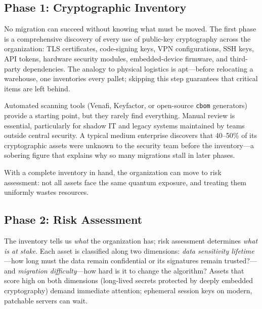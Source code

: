 \subsection{Phase 1: Cryptographic Inventory}
\label{subsec:phase-inventory}

No migration can succeed without knowing what must be moved.  The first phase is a comprehensive discovery of every use of public-key cryptography across the organization: TLS certificates, code-signing keys, VPN configurations, SSH keys, API tokens, hardware security modules, embedded-device firmware, and third-party dependencies.  The analogy to physical logistics is apt---before relocating a warehouse, one inventories every pallet; skipping this step guarantees that critical items are left behind.

Automated scanning tools (Venafi, Keyfactor, or open-source \texttt{cbom} generators) provide a starting point, but they rarely find everything.  Manual review is essential, particularly for shadow IT and legacy systems maintained by teams outside central security.  A typical medium enterprise discovers that 40--50\% of its cryptographic assets were unknown to the security team before the inventory---a sobering figure that explains why so many migrations stall in later phases.

With a complete inventory in hand, the organization can move to risk assessment: not all assets face the same quantum exposure, and treating them uniformly wastes resources.

\subsection{Phase 2: Risk Assessment}
\label{subsec:phase-risk}

The inventory tells us \emph{what} the organization has; risk assessment determines \emph{what is at stake}.  Each asset is classified along two dimensions: \emph{data sensitivity lifetime}---how long must the data remain confidential or its signatures remain trusted?---and \emph{migration difficulty}---how hard is it to change the algorithm?  Assets that score high on both dimensions (long-lived secrets protected by deeply embedded cryptography) demand immediate attention; ephemeral session keys on modern, patchable servers can wait.

